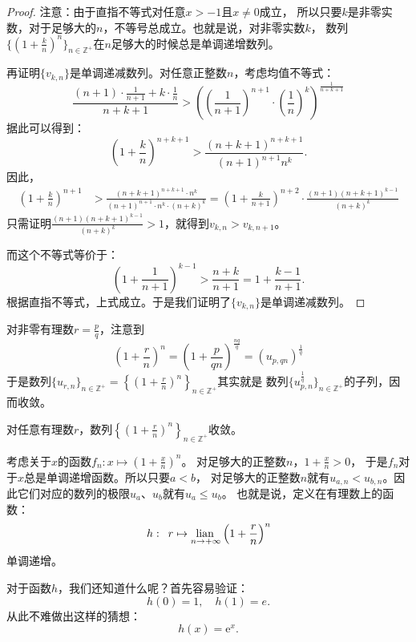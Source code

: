 \documentclass[12pt,UTF8]{ctexbook}
\begin{document}
\begin{appendix}
\begin{proof}
    注意：由于直指不等式对任意$x>-1$且$x\neq 0$成立，
    所以只要$k$是非零实数，对于足够大的$n$，不等号总成立。也就是说，对非零实数$k$，
    数列$\{\left(1 + \frac{k}{n}\right)^n\}_{n\in\mathbb{Z}^+}$在$n$足够大的时候总是单调递增数列。

    再证明$\{v_{k,n}\}$是单调递减数列。对任意正整数$n$，考虑均值不等式：
    $$ \frac{(n+1)\cdot \frac{1}{n+1} + k\cdot \frac{1}{n}}{n+k+1} > \left(\left(\frac{1}{n+1}\right)^{n+1} \cdot \left(\frac{1}{n}\right)^{k}\right)^{\frac{1}{n+k+1}} $$
    据此可以得到：
    $$ \left(1 + \frac{k}{n}\right)^{n+k+1} > \frac{(n+k+1)^{n+k+1}}{(n+1)^{n+1} n^k}. $$
    因此，
    \begin{align*}
        \left(1 + \frac{k}{n}\right)^{n+1} &> \frac{(n+k+1)^{n+k+1}\cdot n^k}{(n+1)^{n+1}\cdot n^k\cdot (n+k)^k} = \left(1 + \frac{k}{n+1}\right)^{n+2} \cdot \frac{(n+1)(n+k+1)^{k-1}}{(n+k)^k} 
    \end{align*}
    只需证明$\frac{(n+1)(n+k+1)^{k-1}}{(n+k)^k} > 1$，就得到$v_{k,n} > v_{k,n+1}$。
    
    而这个不等式等价于：
    $$ \left(1 + \frac{1}{n+1}\right)^{k-1} > \frac{n+k}{n+1} = 1 + \frac{k-1}{n+1}.$$
    根据直指不等式，上式成立。于是我们证明了$\{v_{k,n}\}$是单调递减数列。
\end{proof}

对非零有理数$r = \frac{p}{q}$，注意到
$$ \left(1 + \frac{r}{n}\right)^n = \left(1 + \frac{p}{qn}\right)^{\frac{nq}{q}} = \left(u_{p,qn}\right)^\frac{1}{q}$$
于是数列$\displaystyle\{u_{r,n}\}_{n\in\mathbb{Z}^+} = \left\{\left(1 + \frac{r}{n}\right)^n\right\}_{n\in\mathbb{Z}^+}$其实就是
数列$\{u_{p,n}^{\frac{1}{q}}\}_{n\in\mathbb{Z}^+}$的子列，因而收敛。

\begin{tm}\label{tm:b-1-40}
    对任意有理数$r$，数列$\left\{\left(1 + \frac{r}{n}\right)^n\right\}_{n\in\mathbb{Z}^+}$收敛。
\end{tm}

考虑关于$x$的函数$f_{n} : x \mapsto \left(1 + \frac{x}{n}\right)^n $。
对足够大的正整数$n$，$1 + \frac{x}{n} > 0$， 于是$f_n$对于$x$总是单调递增函数。所以只要$a < b$，
对足够大的正整数$n$就有$u_{a,n} < u_{b,n}$。因此它们对应的数列的极限$u_a$、$u_b$就有$u_a \leqslant u_b$。
也就是说，定义在有理数上的函数：
$$ h: \,\,\, r \mapsto \underset{n\to +\infty}{\operatorname{lian}\,}  \left(1 + \frac{r}{n}\right)^n $$
单调递增。

对于函数$h$，我们还知道什么呢？首先容易验证：
$$ h(0) = 1, \quad h(1) = e.$$ 
从此不难做出这样的猜想：
$$ h(x) = \mathrm{e}^x. $$


\end{appendix}
\end{document}
